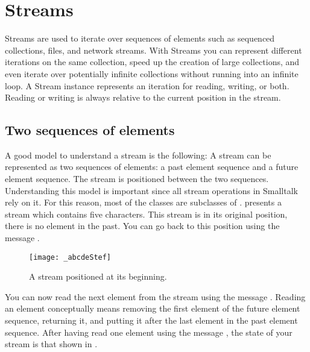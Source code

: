 \documentclass[a4paper,10pt,twoside]{book}
\begin{document}
	\renewcommand{\nnbb}[2]{} %
	\sloppy
\fi
\chapter{Streams}\label{cha:streams}

Streams are used to iterate over sequences of elements such as sequenced collections, files, and network streams. 
With Streams you can represent different iterations on the same collection, speed up the creation of large collections, and even iterate over potentially infinite collections without running into an infinite loop.
A Stream instance represents an iteration for reading, writing, or both.
Reading or writing is always relative to the current position in the stream.

\section{Two sequences of elements}
A good model to understand a stream is the following:
A stream can be represented as two sequences of elements: a past element sequence and a future element sequence.
The stream is positioned between the two sequences.
Understanding this model is important since all stream operations in Smalltalk rely on it.
For this reason, most of the  classes are subclasses of .
 presents a stream which contains five characters. This stream is in its original position, \ie there is no element in the past.
You can go back to this position using the message .

\begin{figure}[ht]
\centerline{\texttt{[image: \_abcdeStef]}}
\caption{A stream positioned at its beginning.}
\label{fig:_abcde}
\vspace{.2in}
\end{figure}

You can now read the next element from the stream using the message . 
Reading an element conceptually means removing the first element of the future element sequence, returning it, and putting it after the last element in the past element sequence.
After having read one element using the message , the state of your stream is that shown in .
\end{document}
